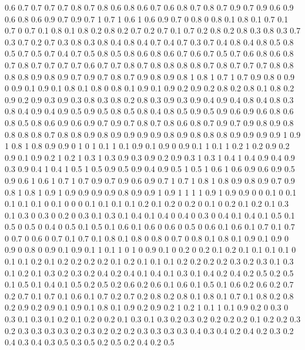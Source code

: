 0.6 0.7
0.7 0.7
0.7 0.8
0.7 0.8
0.6 0.8
0.6 0.7
0.6 0.8
0.7 0.8
0.7 0.9
0.7 0.9
0.6 0.9
0.6 0.8
0.6 0.9
0.7 0.9
0.7 1
0.7 1
0.6 1
0.6 0.9
0.7 0
0.8 0
0.8 0.1
0.8 0.1
0.7 0.1
0.7 0
0.7 0.1
0.8 0.1
0.8 0.2
0.8 0.2
0.7 0.2
0.7 0.1
0.7 0.2
0.8 0.2
0.8 0.3
0.8 0.3
0.7 0.3
0.7 0.2
0.7 0.3
0.8 0.3
0.8 0.4
0.8 0.4
0.7 0.4
0.7 0.3
0.7 0.4
0.8 0.4
0.8 0.5
0.8 0.5
0.7 0.5
0.7 0.4
0.7 0.5
0.8 0.5
0.8 0.6
0.8 0.6
0.7 0.6
0.7 0.5
0.7 0.6
0.8 0.6
0.8 0.7
0.8 0.7
0.7 0.7
0.7 0.6
0.7 0.7
0.8 0.7
0.8 0.8
0.8 0.8
0.7 0.8
0.7 0.7
0.7 0.8
0.8 0.8
0.8 0.9
0.8 0.9
0.7 0.9
0.7 0.8
0.7 0.9
0.8 0.9
0.8 1
0.8 1
0.7 1
0.7 0.9
0.8 0
0.9 0
0.9 0.1
0.9 0.1
0.8 0.1
0.8 0
0.8 0.1
0.9 0.1
0.9 0.2
0.9 0.2
0.8 0.2
0.8 0.1
0.8 0.2
0.9 0.2
0.9 0.3
0.9 0.3
0.8 0.3
0.8 0.2
0.8 0.3
0.9 0.3
0.9 0.4
0.9 0.4
0.8 0.4
0.8 0.3
0.8 0.4
0.9 0.4
0.9 0.5
0.9 0.5
0.8 0.5
0.8 0.4
0.8 0.5
0.9 0.5
0.9 0.6
0.9 0.6
0.8 0.6
0.8 0.5
0.8 0.6
0.9 0.6
0.9 0.7
0.9 0.7
0.8 0.7
0.8 0.6
0.8 0.7
0.9 0.7
0.9 0.8
0.9 0.8
0.8 0.8
0.8 0.7
0.8 0.8
0.9 0.8
0.9 0.9
0.9 0.9
0.8 0.9
0.8 0.8
0.8 0.9
0.9 0.9
0.9 1
0.9 1
0.8 1
0.8 0.9
0.9 0
1 0
1 0.1
1 0.1
0.9 0.1
0.9 0
0.9 0.1
1 0.1
1 0.2
1 0.2
0.9 0.2
0.9 0.1
0.9 0.2
1 0.2
1 0.3
1 0.3
0.9 0.3
0.9 0.2
0.9 0.3
1 0.3
1 0.4
1 0.4
0.9 0.4
0.9 0.3
0.9 0.4
1 0.4
1 0.5
1 0.5
0.9 0.5
0.9 0.4
0.9 0.5
1 0.5
1 0.6
1 0.6
0.9 0.6
0.9 0.5
0.9 0.6
1 0.6
1 0.7
1 0.7
0.9 0.7
0.9 0.6
0.9 0.7
1 0.7
1 0.8
1 0.8
0.9 0.8
0.9 0.7
0.9 0.8
1 0.8
1 0.9
1 0.9
0.9 0.9
0.9 0.8
0.9 0.9
1 0.9
1 1
1 1
0.9 1
0.9 0.9
0 0
0.1 0
0.1 0.1
0.1 0.1
0 0.1
0 0
0 0.1
0.1 0.1
0.1 0.2
0.1 0.2
0 0.2
0 0.1
0 0.2
0.1 0.2
0.1 0.3
0.1 0.3
0 0.3
0 0.2
0 0.3
0.1 0.3
0.1 0.4
0.1 0.4
0 0.4
0 0.3
0 0.4
0.1 0.4
0.1 0.5
0.1 0.5
0 0.5
0 0.4
0 0.5
0.1 0.5
0.1 0.6
0.1 0.6
0 0.6
0 0.5
0 0.6
0.1 0.6
0.1 0.7
0.1 0.7
0 0.7
0 0.6
0 0.7
0.1 0.7
0.1 0.8
0.1 0.8
0 0.8
0 0.7
0 0.8
0.1 0.8
0.1 0.9
0.1 0.9
0 0.9
0 0.8
0 0.9
0.1 0.9
0.1 1
0.1 1
0 1
0 0.9
0.1 0
0.2 0
0.2 0.1
0.2 0.1
0.1 0.1
0.1 0
0.1 0.1
0.2 0.1
0.2 0.2
0.2 0.2
0.1 0.2
0.1 0.1
0.1 0.2
0.2 0.2
0.2 0.3
0.2 0.3
0.1 0.3
0.1 0.2
0.1 0.3
0.2 0.3
0.2 0.4
0.2 0.4
0.1 0.4
0.1 0.3
0.1 0.4
0.2 0.4
0.2 0.5
0.2 0.5
0.1 0.5
0.1 0.4
0.1 0.5
0.2 0.5
0.2 0.6
0.2 0.6
0.1 0.6
0.1 0.5
0.1 0.6
0.2 0.6
0.2 0.7
0.2 0.7
0.1 0.7
0.1 0.6
0.1 0.7
0.2 0.7
0.2 0.8
0.2 0.8
0.1 0.8
0.1 0.7
0.1 0.8
0.2 0.8
0.2 0.9
0.2 0.9
0.1 0.9
0.1 0.8
0.1 0.9
0.2 0.9
0.2 1
0.2 1
0.1 1
0.1 0.9
0.2 0
0.3 0
0.3 0.1
0.3 0.1
0.2 0.1
0.2 0
0.2 0.1
0.3 0.1
0.3 0.2
0.3 0.2
0.2 0.2
0.2 0.1
0.2 0.2
0.3 0.2
0.3 0.3
0.3 0.3
0.2 0.3
0.2 0.2
0.2 0.3
0.3 0.3
0.3 0.4
0.3 0.4
0.2 0.4
0.2 0.3
0.2 0.4
0.3 0.4
0.3 0.5
0.3 0.5
0.2 0.5
0.2 0.4
0.2 0.5
